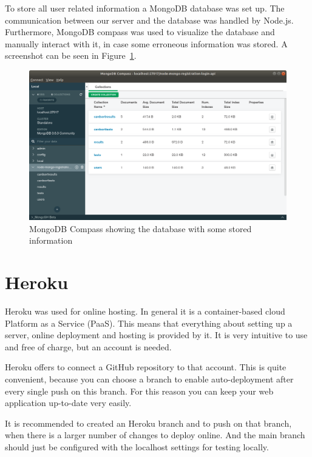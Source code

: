 To store all user related information a MongoDB database was set up. The 
communication between our server and the database was handled by Node.js. 
Furthermore, MongoDB compass was used to visualize the database and manually 
interact with it, in case some erroneous information was stored. A screenshot 
can be seen in Figure~\ref{fig:mongodb_compass}. 


\begin{figure}[tp]  \centering
\includegraphics[keepaspectratio,width=\linewidth,height=\halfh]{images/technologies/mongodb_compass.png}
\caption[MongoDB Compass] 
{MongoDB Compass showing the database with some stored information
 } 
\label{fig:mongodb_compass} 
\end{figure}

\section{Heroku}

Heroku was used for online hosting. In general it is a container-based 
cloud Platform as a Service (PaaS). This means that everything about 
setting up a server, online deployment and hosting is provided by it. It 
is very intuitive to use and free of charge, but an account is needed. 

Heroku offers to connect a GitHub repository to that account. This is 
quite convenient, because you can choose a branch to enable 
auto-deployment after every single push on this branch. For this reason 
you can keep your web application up-to-date very easily. 

It is recommended to created an Heroku branch and to push on that 
branch, when there is a larger number of changes to deploy online. 
And the main branch should just be configured with the localhost 
settings for testing locally.

